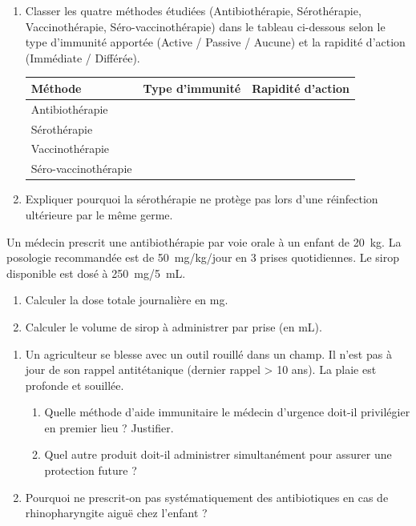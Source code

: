 \documentclass[11pt]{article}
\begin{document}
\begin{exercice}
\begin{enumerate}
    \item Classer les quatre méthodes étudiées (Antibiothérapie, Sérothérapie, Vaccinothérapie, Séro-vaccinothérapie) dans le tableau ci-dessous selon le type d'immunité apportée (Active / Passive / Aucune) et la rapidité d'action (Immédiate / Différée).
    \begin{tabular}{|l|c|c|}
    \hline
    \textbf{Méthode} & \textbf{Type d'immunité} & \textbf{Rapidité d'action} \\
    \hline
    Antibiothérapie & & \\
    \hline
    Sérothérapie & & \\
    \hline
    Vaccinothérapie & & \\
    \hline
    Séro-vaccinothérapie & & \\
    \hline
    \end{tabular}
    \item Expliquer pourquoi la sérothérapie ne protège pas lors d'une réinfection ultérieure par le même germe.
\end{enumerate}
\end{exercice}

\begin{exercice}
Un médecin prescrit une antibiothérapie par voie orale à un enfant de \SI{20}{kg}. La posologie recommandée est de \SI{50}{mg/kg/jour} en 3 prises quotidiennes. Le sirop disponible est dosé à \SI{250}{mg/5 mL}.
\begin{enumerate}
    \item Calculer la dose totale journalière en mg.
    \item Calculer le volume de sirop à administrer par prise (en mL).
\end{enumerate}
\end{exercice}

\begin{exercice}
\begin{enumerate}
    \item Un agriculteur se blesse avec un outil rouillé dans un champ. Il n'est pas à jour de son rappel antitétanique (dernier rappel > 10 ans). La plaie est profonde et souillée.
    \begin{enumerate}
        \item Quelle méthode d'aide immunitaire le médecin d'urgence doit-il privilégier en premier lieu ? Justifier.
        \item Quel autre produit doit-il administrer simultanément pour assurer une protection future ?
    \end{enumerate}
    \item Pourquoi ne prescrit-on pas systématiquement des antibiotiques en cas de rhinopharyngite aiguë chez l'enfant ?
\end{enumerate}
\end{exercice}
\end{document}
